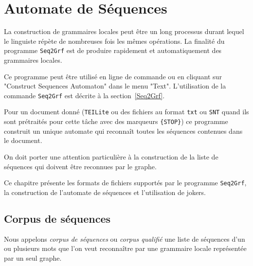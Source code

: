 \chapter{Automate de Séquences}
\label{chap-sequence-automaton}

La construction de grammaires locales peut être un long processus durant lequel le linguiste répète
de nombreuses fois les mêmes opérations. La finalité du programme \verb+Seq2Grf+ est de produire
rapidement et automatiquement des grammaires locales.


\bigskip
\noindent
Ce programme peut être utilisé en ligne de commande ou en cliquant sur "Construct Sequences
Automaton" dans le menu "Text". L'utilisation de la commande \verb+Seq2Grf+ est décrite à la
section~\ref{Seq2Grf}.

\bigskip
\noindent Pour un document donné (\verb+TEILite+ ou des fichiers au format \verb+txt+ ou \verb+SNT+
quand ils sont prétraités pour cette tâche avec des marqueurs \verb+{STOP}+) ce programme
construit un
unique automate qui reconnaît toutes les séquences contenues dans le document.

\bigskip
\noindent On doit porter une attention particulière à la construction de la liste de séquences qui
doivent être reconnues par le graphe.

\bigskip
\noindent Ce chapitre présente les formats de fichiers supportés par le programme \verb+Seq2Grf+, la
construction de l'automate de séquences et l'utilisation de jokers.
\bigskip


\section{Corpus de séquences}
Nous appelons \textit{corpus de séquences} ou \textit{corpus qualifié}
 une liste de séquences d'un ou plusieurs mots que l'on veut reconnaître par
une grammaire locale représentée par un seul graphe.
\bigskip

